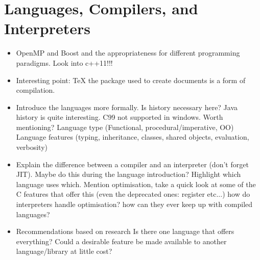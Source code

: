 \documentclass[11pt]{article} %
\begin{document}
\section{Languages, Compilers, and Interpreters}
\begin{itemize}
\item OpenMP and Boost and the appropriateness for different programming paradigms. Look into c++11!!!
\item Interesting point: TeX the package used to create documents is a form of compilation.
\item Introduce the languages more formally.
\subitem Is history necessary here? Java history is quite interesting. 
\subitem C99 not supported in windows. Worth mentioning?
\subitem Language type (Functional, procedural/imperative, OO)
\subitem Language features (typing, inheritance, classes, shared objects, evaluation, verbosity)
\item Explain the difference between a compiler and an interpreter (don't forget JIT). 
\subitem Maybe do this during the language introduction? 
\subitem Highlight which language uses which.
\subitem Mention optimisation, take a quick look at some of the C features that offer this (even the deprecated ones: register etc...)
\subitem how do interpreters handle optimisation?
\subitem how can they ever keep up with compiled languages?
\item Recommendations based on research
\subitem Is there one language that offers everything?
\subitem Could a desirable feature be made available to another language/library at little cost?
\end{itemize}
\end{document}
